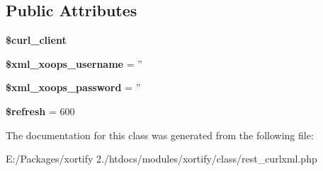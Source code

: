 \subsection*{Public Attributes}
\begin{DoxyCompactItemize}
\item 
\hypertarget{class_r_e_s_t___c_u_r_l_x_m_l_xortify_exchange_a48ace86f5feca4909a4995c4a0f1c0db}{{\bfseries \$curl\-\_\-client}}\label{class_r_e_s_t___c_u_r_l_x_m_l_xortify_exchange_a48ace86f5feca4909a4995c4a0f1c0db}

\item 
\hypertarget{class_r_e_s_t___c_u_r_l_x_m_l_xortify_exchange_a5f4a53d03a72fc2d83f2367aaba37ee2}{{\bfseries \$xml\-\_\-xoops\-\_\-username} = ''}\label{class_r_e_s_t___c_u_r_l_x_m_l_xortify_exchange_a5f4a53d03a72fc2d83f2367aaba37ee2}

\item 
\hypertarget{class_r_e_s_t___c_u_r_l_x_m_l_xortify_exchange_acddfefddabc63ce705d2e8677d3e21a0}{{\bfseries \$xml\-\_\-xoops\-\_\-password} = ''}\label{class_r_e_s_t___c_u_r_l_x_m_l_xortify_exchange_acddfefddabc63ce705d2e8677d3e21a0}

\item 
\hypertarget{class_r_e_s_t___c_u_r_l_x_m_l_xortify_exchange_a74bddf2801aec11171d88380a2212240}{{\bfseries \$refresh} = 600}\label{class_r_e_s_t___c_u_r_l_x_m_l_xortify_exchange_a74bddf2801aec11171d88380a2212240}

\end{DoxyCompactItemize}


The documentation for this class was generated from the following file\-:\begin{DoxyCompactItemize}
\item 
E\-:/\-Packages/xortify 2./htdocs/modules/xortify/class/rest\-\_\-curlxml.\-php\end{DoxyCompactItemize}
